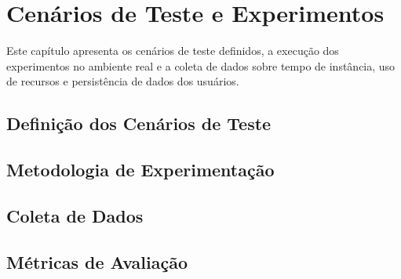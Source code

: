 \chapter{Cenários de Teste e Experimentos}

Este capítulo apresenta os cenários de teste definidos, a execução dos experimentos no ambiente real e a coleta de dados sobre tempo de instância, uso de recursos e persistência de dados dos usuários.

\section{Definição dos Cenários de Teste}

\section{Metodologia de Experimentação}

\section{Coleta de Dados}

\section{Métricas de Avaliação}
